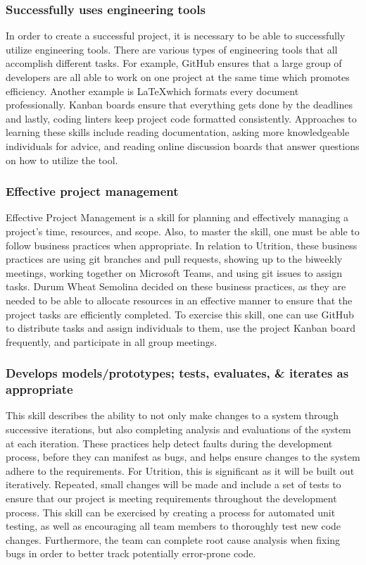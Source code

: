 \documentclass[12pt]{article}
\begin{document}
\subsubsection{Successfully uses engineering tools}
In order to create a successful project, it is necessary to be able to successfully utilize engineering tools. There are various types of engineering tools that all accomplish different tasks. For example, GitHub ensures that a large group of developers are all able to work on one project at the same time which promotes efficiency. Another example is \LaTeX which formats every document professionally. Kanban boards ensure that everything gets done by the deadlines and lastly, coding linters keep project code formatted consistently. Approaches to learning these skills include reading documentation, asking more knowledgeable individuals for advice, and reading online discussion boards that answer questions on how to utilize the tool. 

\subsubsection{Effective project management}
Effective Project Management is a skill for planning and effectively managing a project’s time, resources, and scope. Also, to master the skill, one must be able to follow business practices when appropriate. In relation to Utrition, these business practices are using git branches and pull requests, showing up to the biweekly meetings, working together on Microsoft Teams, and using git issues to assign tasks. Durum Wheat Semolina decided on these business practices, as they are needed to be able to allocate resources in an effective manner to ensure that the project tasks are efficiently completed. To exercise this skill, one can use GitHub to distribute tasks and assign individuals to them, use the project Kanban board frequently, and participate in all group meetings.

\subsubsection{Develops models/prototypes; tests, evaluates, \& iterates as 
appropriate}
This skill describes the ability to not only make changes to a system through 
successive iterations, but also completing analysis and evaluations of the 
system at each iteration. These practices help detect faults during the 
development process, before they can manifest as bugs, and helps ensure changes 
to the system adhere to the requirements. For Utrition, this is significant as 
it will be built out iteratively. Repeated, small changes will be made and 
include a set of tests to ensure that our project is meeting requirements 
throughout the development process. This skill can be exercised by creating a 
process for automated unit testing, as well as encouraging all team members to thoroughly test new code changes. Furthermore, the team can complete root cause 
analysis when fixing bugs in order to better track potentially error-prone code.
\end{document}
